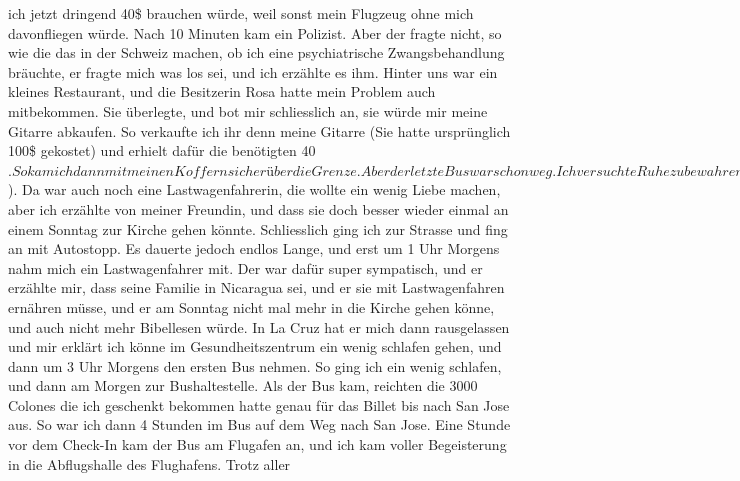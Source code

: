 \documentclass[
]{article}
\begin{document}
ich jetzt dringend 40\$ brauchen würde, weil sonst mein Flugzeug ohne
mich davonfliegen würde. Nach 10 Minuten kam ein Polizist. Aber der
fragte nicht, so wie die das in der Schweiz machen, ob ich eine
psychiatrische Zwangsbehandlung bräuchte, er fragte mich was los sei,
und ich erzählte es ihm. Hinter uns war ein kleines Restaurant, und die
Besitzerin Rosa hatte mein Problem auch mitbekommen. Sie überlegte, und
bot mir schliesslich an, sie würde mir meine Gitarre abkaufen. So
verkaufte ich ihr denn meine Gitarre (Sie hatte ursprünglich 100\$
gekostet) und erhielt dafür die benötigten
40\(. So kam ich dann mit meinen Koffern sicher über die Grenze. Aber der letzte Bus war schon weg. Ich versuchte Ruhe zu bewahren, und einfach weiterzumachen. Gott wird schon schauen. Was jetzt? Bleibt nur noch Autostopp. Hier hat es ja viele Lastwagen, da fährt sicher einer nach San Jose, oder? Da hatte es ein Häuschen mit vielen Lastwagenfahrern. Ich setzte mich zu denen, und wir erzählten. Zwei waren von Nicaragua und hatten eine solche Freude, dass sie mir 3000 Colones schenkten (6\)).
Da war auch noch eine Lastwagenfahrerin, die wollte ein wenig Liebe
machen, aber ich erzählte von meiner Freundin, und dass sie doch besser
wieder einmal an einem Sonntag zur Kirche gehen könnte. Schliesslich
ging ich zur Strasse und fing an mit Autostopp. Es dauerte jedoch endlos
Lange, und erst um 1 Uhr Morgens nahm mich ein Lastwagenfahrer mit. Der
war dafür super sympatisch, und er erzählte mir, dass seine Familie in
Nicaragua sei, und er sie mit Lastwagenfahren ernähren müsse, und er am
Sonntag nicht mal mehr in die Kirche gehen könne, und auch nicht mehr
Bibellesen würde. In La Cruz hat er mich dann rausgelassen und mir
erklärt ich könne im Gesundheitszentrum ein wenig schlafen gehen, und
dann um 3 Uhr Morgens den ersten Bus nehmen. So ging ich ein wenig
schlafen, und dann am Morgen zur Bushaltestelle. Als der Bus kam,
reichten die 3000 Colones die ich geschenkt bekommen hatte genau für das
Billet bis nach San Jose aus. So war ich dann 4 Stunden im Bus auf dem
Weg nach San Jose. Eine Stunde vor dem Check-In kam der Bus am Flugafen
an, und ich kam voller Begeisterung in die Abflugshalle des Flughafens.
Trotz aller
\end{document}
